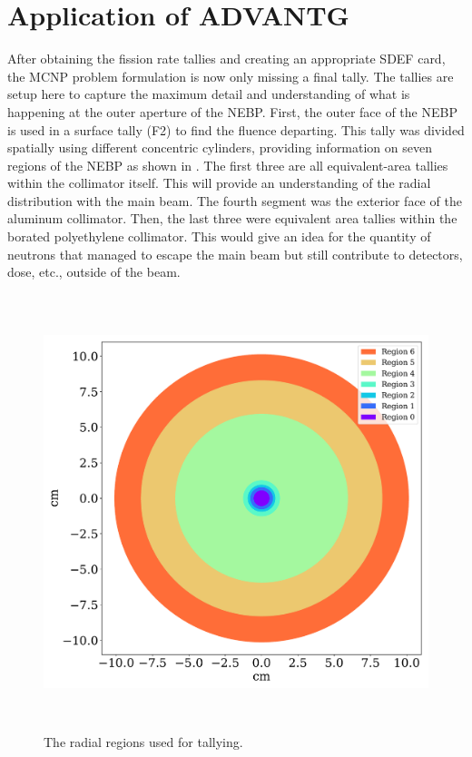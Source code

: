 \section{Application of ADVANTG}

After obtaining the fission rate tallies and creating an appropriate SDEF card, the MCNP problem formulation is now only missing a final tally.
The tallies are setup here to capture the maximum detail and understanding of what is happening at the outer aperture of the NEBP.
First, the outer face of the NEBP is used in a surface tally (F2) to find the fluence departing.
This tally was divided spatially using different concentric cylinders, providing information on seven regions of the NEBP as shown in .
The first three are all equivalent-area tallies within the collimator itself.
This will provide an understanding of the radial distribution with the main beam.
The fourth segment was the exterior face of the aluminum collimator.
Then, the last three were equivalent area tallies within the borated polyethylene collimator.
This would give an idea for the quantity of neutrons that managed to escape the main beam but still contribute to detectors, dose, etc., outside of the beam.

\begin{figure}[htb]
\centering
\includegraphics[height=5in]{tex/figures/region_diagram.pdf}
\caption[Tally Region Diagram]{The radial regions used for tallying.}
\label{fig:region_diagram}
\end{figure}

